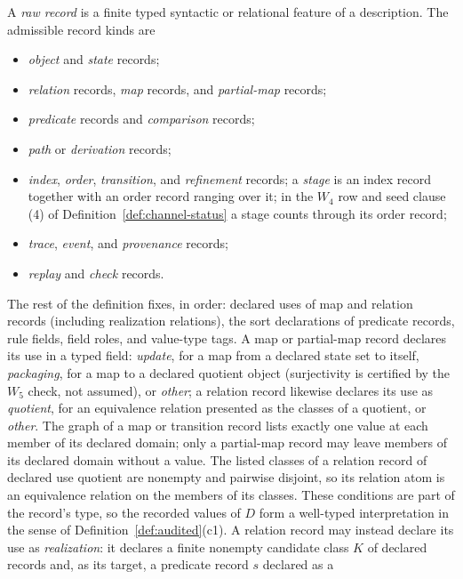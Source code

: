 \begin{definition}\label{def:raw-record}
A \emph{raw record} is a finite typed syntactic or relational feature of a
description. The admissible record kinds are
\begin{itemize}[topsep=2pt,itemsep=1pt]
  \item \emph{object} and \emph{state} records;
  \item \emph{relation} records, \emph{map} records, and \emph{partial-map}
    records;
  \item \emph{predicate} records and \emph{comparison} records;
  \item \emph{path} or \emph{derivation} records;
  \item \emph{index}, \emph{order}, \emph{transition}, and \emph{refinement}
    records; a \emph{stage} is an index record together with an order
    record ranging over it; in the \(W_4\) row and seed clause (4) of Definition~\ref{def:channel-status} a stage
    counts through its order record;
  \item \emph{trace}, \emph{event}, and \emph{provenance} records;
  \item \emph{replay} and \emph{check} records.
\end{itemize}
The rest of the definition fixes, in order: declared uses of map and relation records (including realization relations), the sort declarations of predicate records, rule fields, field roles, and value-type tags.
A map or partial-map record declares its use in a typed field: \emph{update},
for a map from a declared state set to itself, \emph{packaging}, for a map to
a declared quotient object (surjectivity is certified by the \(W_5\) check, not assumed), or \emph{other}; a relation record likewise declares its use
as \emph{quotient}, for an equivalence relation presented as the classes of a
quotient, or \emph{other}. The graph of a map or transition record lists exactly
one value at each member of its declared domain; only a partial-map record may
leave members of its declared domain without a value. The listed classes of a relation record of declared use quotient are nonempty and pairwise disjoint, so its relation atom is an equivalence relation on the members of its classes. These conditions are part of the
record's type, so the recorded values of \(D\) form a well-typed interpretation
in the sense of Definition~\ref{def:audited}(c1). A relation record may instead declare its use as
\emph{realization}: it declares a finite nonempty candidate class \(K\) of
declared records and, as its target, a predicate record \(s\) declared as a

\end{definition}
